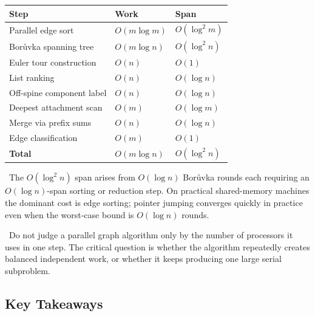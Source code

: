 \begin{center}
\renewcommand{\arraystretch}{1.3}
\begin{tabular}{lll}
\hline
\textbf{Step} & \textbf{Work} & \textbf{Span} \\
\hline
Parallel edge sort        & \(O(m \log m)\) & \(O(\log^2 m)\) \\
Borůvka spanning tree     & \(O(m \log n)\) & \(O(\log^2 n)\) \\
Euler tour construction   & \(O(n)\)        & \(O(1)\)        \\
List ranking              & \(O(n)\)        & \(O(\log n)\)   \\
Off-spine component label & \(O(n)\)        & \(O(\log n)\)   \\
Deepest attachment scan   & \(O(m)\)        & \(O(\log m)\)   \\
Merge via prefix sums     & \(O(n)\)        & \(O(\log n)\)   \\
Edge classification       & \(O(m)\)        & \(O(1)\)        \\
\hline
\textbf{Total}            & \(O(m \log n)\) & \(O(\log^2 n)\) \\
\hline
\end{tabular}
\end{center}

\begin{ppnote}
\ The \(O(\log^2 n)\) span arises from \(O(\log n)\) Borůvka rounds each requiring an \(O(\log n)\)-span
sorting or reduction step.
On practical shared-memory machines the dominant cost is edge sorting;
pointer jumping converges quickly in practice even when the worst-case bound is \(O(\log n)\) rounds.
\end{ppnote}

\begin{pppitfall}
\ Do not judge a parallel graph algorithm only by the number of processors it uses in one step.
The critical question is whether the algorithm repeatedly creates balanced independent work, or whether it keeps producing one large serial subproblem.
\end{pppitfall}

\subsection{Key Takeaways}

